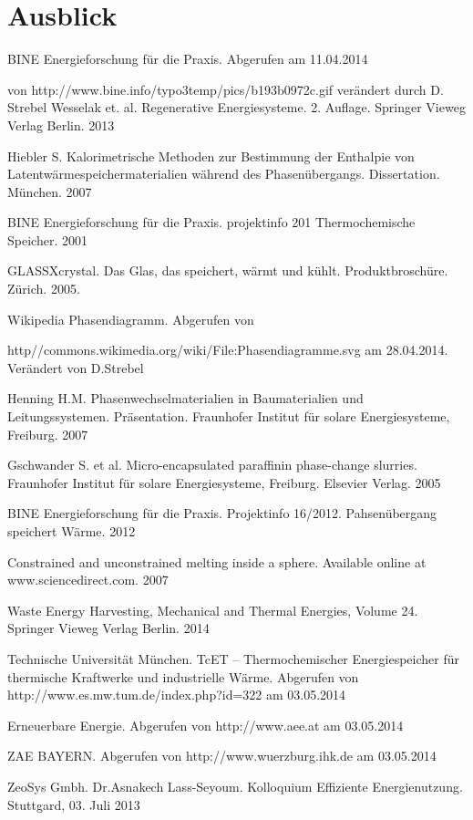 \documentclass[11pt,a4paper]{scrartcl}
\begin{document}
\section{Ausblick}
\newpage
\listoftables
\newpage
\listoffigures
\newpage
\begin{thebibliography}{99}
	BINE Energieforschung für die Praxis. Abgerufen am 11.04.2014
	
	von http://www.bine.info/typo3temp/pics/b193b0972c.gif verändert durch D. Strebel
	Wesselak et. al. Regenerative Energiesysteme. 2. Auflage.
	Springer Vieweg Verlag Berlin. 2013
	
	 Hiebler S. Kalorimetrische Methoden zur Bestimmung der
	Enthalpie von Latentwärmespeichermaterialien während des Phasenübergangs. Dissertation.
	München. 2007
	
	 BINE Energieforschung für die Praxis. projektinfo 2\/01
	Thermochemische Speicher. 2001
	
	 GLASSX\circledR crystal. Das Glas, das speichert, wärmt und
	kühlt. Produktbroschüre. Zürich. 2005.
	 
	 Wikipedia Phasendiagramm. 
	Abgerufen von
	
	http//commons.wikimedia.org/wiki/File:Phasendiagramme.svg am 28.04.2014.
	Verändert von D.Strebel
	
	 Henning H.M. Phasenwechselmaterialien in Baumaterialien und
	Leitungssystemen. Präsentation. Fraunhofer Institut für solare Energiesysteme,
	Freiburg. 2007
	
	 Gschwander S. et al. Micro-encapsulated paraffinin
	phase-change slurries. Fraunhofer Institut für solare Energiesysteme,
	Freiburg. Elsevier Verlag. 2005

	 BINE Energieforschung für die Praxis. Projektinfo 16/2012.
	Pahsenübergang speichert Wärme. 2012
		
	 Constrained and unconstrained melting inside a sphere. Available online at www.sciencedirect.com. 2007
	
	 Waste Energy Harvesting, Mechanical and Thermal Energies, Volume 24.
		Springer Vieweg Verlag Berlin. 2014
		
	 Technische Universität München. TcET – Thermochemischer Energiespeicher für thermische Kraftwerke und industrielle Wärme.
	Abgerufen von http://www.es.mw.tum.de/index.php?id=322 am 03.05.2014		
		
	
	 Erneuerbare Energie. 
	Abgerufen von http://www.aee.at am 03.05.2014
	
	
     ZAE BAYERN. Abgerufen von http://www.wuerzburg.ihk.de am 03.05.2014	%
    
     ZeoSys Gmbh. Dr.Asnakech Lass-Seyoum. Kolloquium Effiziente Energienutzung. Stuttgard, 03. Juli 2013
	
\end{thebibliography}
\end{document}
